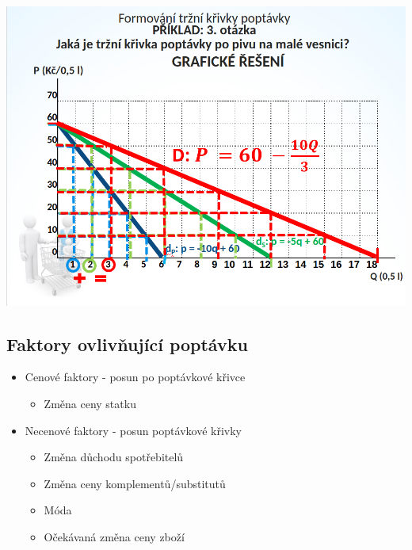 \includegraphics[width=16cm]{images/07_graficky.png}

\subsection{Faktory ovlivňující poptávku}
\begin{itemize}
    \item Cenové faktory - posun po poptávkové křivce
    \begin{itemize}
        \item Změna ceny statku
    \end{itemize}
    \item Necenové faktory - posun poptávkové křivky
    \begin{itemize}
        \item Změna důchodu spotřebitelů
        \item Změna ceny komplementů/substitutů
        \item Móda
        \item Očekávaná změna ceny zboží
    \end{itemize}
\end{itemize}

